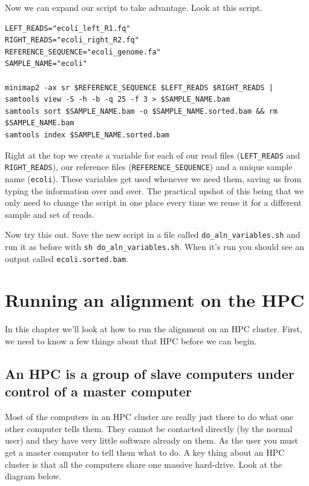 \documentclass[]{book}
\begin{document}
Now we can expand our script to take advantage. Look at this script.

\begin{verbatim}
LEFT_READS="ecoli_left_R1.fq"
RIGHT_READS="ecoli_right_R2.fq"
REFERENCE_SEQUENCE="ecoli_genome.fa"
SAMPLE_NAME="ecoli"

minimap2 -ax sr $REFERENCE_SEQUENCE $LEFT_READS $RIGHT_READS | samtools view -S -h -b -q 25 -f 3 > $SAMPLE_NAME.bam
samtools sort $SAMPLE_NAME.bam -o $SAMPLE_NAME.sorted.bam && rm $SAMPLE_NAME.bam
samtools index $SAMPLE_NAME.sorted.bam
\end{verbatim}

Right at the top we create a variable for each of our read files (\texttt{LEFT\_READS} and \texttt{RIGHT\_READS}), our reference files (\texttt{REFERENCE\_SEQUENCE}) and a unique sample name (\texttt{ecoli}). These variables get used whenever we need them, saving us from typing the information over and over. The practical upshot of this being that we only need to change the script in one place every time we reuse it for a different sample and set of reads.

Now try this out. Save the new script in a file called \texttt{do\_aln\_variables.sh} and run it as before with \texttt{sh\ do\_aln\_variables.sh}. When it's run you should see an output called \texttt{ecoli.sorted.bam}.

\hypertarget{running-an-alignment-on-the-hpc}{%
\chapter{Running an alignment on the HPC}\label{running-an-alignment-on-the-hpc}}

In this chapter we'll look at how to run the alignment on an HPC cluster. First, we need to know a few things about that HPC before we can begin.

\hypertarget{an-hpc-is-a-group-of-slave-computers-under-control-of-a-master-computer}{%
\section{An HPC is a group of slave computers under control of a master computer}\label{an-hpc-is-a-group-of-slave-computers-under-control-of-a-master-computer}}

Most of the computers in an HPC cluster are really just there to do what one other computer tells them. They cannot be contacted directly (by the normal user) and they have very little software already on them. As the user you must get a master computer to tell them what to do. A key thing about an HPC cluster is that all the computers share one massive hard-drive. Look at the diagram below.
\end{document}
